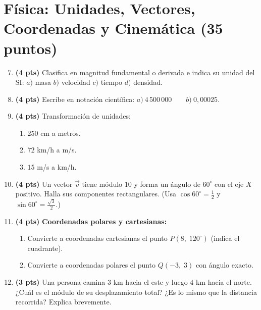 \documentclass[12pt, letterpaper]{article}
\providecommand{\sen}{\sin}
\begin{document}
\section{Física: Unidades, Vectores, Coordenadas y Cinemática (35 puntos)}

\begin{enumerate}[leftmargin=*]
  \setcounter{enumi}{6}
  \item \textbf{(4 pts)} Clasifica en magnitud fundamental o derivada e indica su unidad del SI: $a)$ masa \quad $b)$ velocidad \quad $c)$ tiempo \quad $d)$ densidad.

  \item \textbf{(4 pts)} Escribe en notación científica: $a)\ 4\,500\,000 \qquad b)\ 0{,}00025$.

  \item \textbf{(4 pts)} Transformación de unidades:
        \begin{enumerate}[label=\alph*)]
          \item $250$ cm a metros.
          \item $72$ km/h a m/s.
          \item $15$ m/s a km/h.
        \end{enumerate}

  \item \textbf{(4 pts)} Un vector $\vec{v}$ tiene módulo $10$ y forma un ángulo de $60^{\circ}$ con el eje $X$ positivo. Halla sus componentes rectangulares. (Usa $\cos 60^{\circ} = \tfrac{1}{2}$ y $\sen 60^{\circ} = \tfrac{\sqrt{3}}{2}$.)

  \item \textbf{(4 pts)} \textbf{Coordenadas polares y cartesianas:}
        \begin{enumerate}[label=\alph*)]
          \item Convierte a coordenadas cartesianas el punto $P(8,\; 120^{\circ})$ (indica el cuadrante).
          \item Convierte a coordenadas polares el punto $Q(-3,\; 3)$ con ángulo exacto.
        \end{enumerate}

  \item \textbf{(3 pts)} Una persona camina $3$ km hacia el este y luego $4$ km hacia el norte. ¿Cuál es el módulo de su desplazamiento total? ¿Es lo mismo que la distancia recorrida? Explica brevemente.


\end{enumerate}
\end{document}
